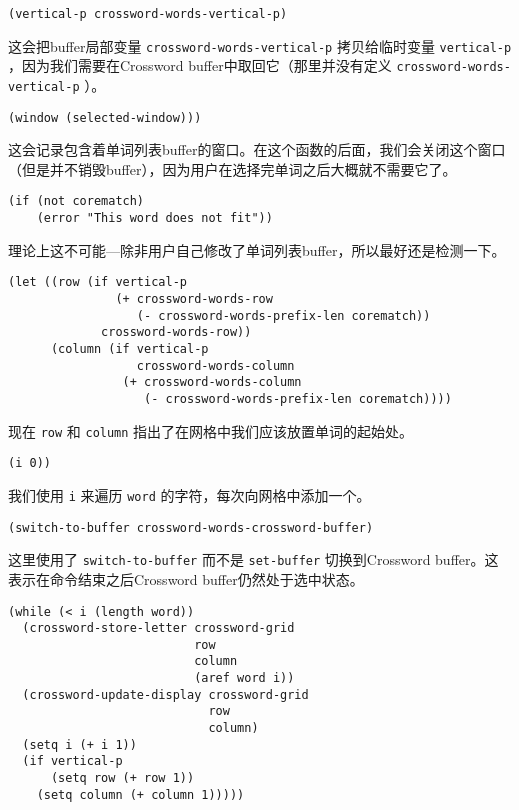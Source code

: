 \begin{verbatim}
(vertical-p crossword-words-vertical-p)
\end{verbatim}

这会把buffer局部变量 \texttt{crossword-words-vertical-p} 拷贝给临时变量 \texttt{vertical-p} ，因为我们需要在Crossword buffer中取回它（那里并没有定义 \texttt{crossword-words-vertical-p} ）。

\begin{verbatim}
(window (selected-window)))
\end{verbatim}

这会记录包含着单词列表buffer的窗口。在这个函数的后面，我们会关闭这个窗口（但是并不销毁buffer），因为用户在选择完单词之后大概就不需要它了。

\begin{verbatim}
(if (not corematch)
    (error "This word does not fit"))
\end{verbatim}

理论上这不可能---除非用户自己修改了单词列表buffer，所以最好还是检测一下。

\begin{verbatim}
(let ((row (if vertical-p
               (+ crossword-words-row
                  (- crossword-words-prefix-len corematch))
             crossword-words-row))
      (column (if vertical-p
                  crossword-words-column
                (+ crossword-words-column
                   (- crossword-words-prefix-len corematch))))
\end{verbatim}

现在 \texttt{row} 和 \texttt{column} 指出了在网格中我们应该放置单词的起始处。

\begin{verbatim}
(i 0))
\end{verbatim}

我们使用 \texttt{i} 来遍历 \texttt{word} 的字符，每次向网格中添加一个。

\begin{verbatim}
(switch-to-buffer crossword-words-crossword-buffer)
\end{verbatim}

这里使用了 \texttt{switch-to-buffer} 而不是 \texttt{set-buffer} 切换到Crossword buffer。这表示在命令结束之后Crossword buffer仍然处于选中状态。

\begin{verbatim}
(while (< i (length word))
  (crossword-store-letter crossword-grid
                          row
                          column
                          (aref word i))
  (crossword-update-display crossword-grid
                            row
                            column)
  (setq i (+ i 1))
  (if vertical-p
      (setq row (+ row 1))
    (setq column (+ column 1)))))
\end{verbatim}

